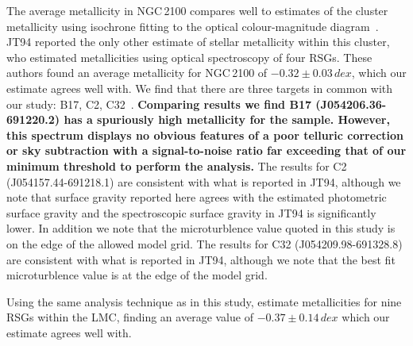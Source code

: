 \documentclass[useAMS,usenatbib]{mn2e}
\begin{document}
The average metallicity in NGC\,2100 compares well to estimates of the cluster metallicity using isochrone fitting to the optical colour-magnitude diagram~\citep[$-0.34\,dex$;][]{2015A&A...575A..62N}.
JT94 reported the only other estimate of stellar metallicity within this cluster,
who estimated metallicities using optical spectroscopy of four RSGs.
These authors found an average metallicity for NGC\,2100 of $-0.32\pm0.03\,dex$, which our estimate agrees well with.
We find that there are three targets in common with our study: B17, C2, C32~\citep[using the][nomenclature]{1974A&AS...15..261R}.
\textbf{Comparing results we find B17 (J054206.36-691220.2) has a spuriously high metallicity for the sample.
However, this spectrum displays no obvious features of a poor telluric correction or sky subtraction with a signal-to-noise ratio far exceeding that of our minimum threshold to perform the analysis.}
The results for C2 (J054157.44-691218.1) are consistent with what is reported in JT94, although we note that surface gravity reported here agrees with the estimated photometric surface gravity and the spectroscopic surface gravity in JT94 is significantly lower.
In addition we note that the microturblence value quoted in this study is on the edge of the allowed model grid.
The results for C32 (J054209.98-691328.8) are consistent with what is reported in JT94, although we note that the best fit microturblence value is at the edge of the model grid.


Using the same analysis technique as in this study,
\cite{2015ApJ...806...21D} estimate metallicities for nine RSGs within the LMC,
finding an average value of $-0.37\pm0.14\,dex$ which our estimate agrees well with.
\end{document}
